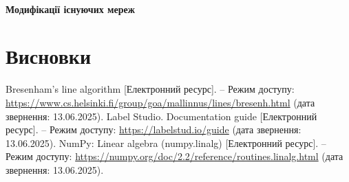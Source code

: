 \documentclass[a4paper,14pt]{report}
\begin{document}
\subsubsection{Модифікації існуючих мереж}

 



\chapter{Висновки}

\begin{thebibliography}{9}
Bresenham's line algorithm [Електронний ресурс]. – Режим доступу: \url{https://www.cs.helsinki.fi/group/goa/mallinnus/lines/bresenh.html} (дата звернення: 13.06.2025).
Label Studio. Documentation guide [Електронний ресурс]. – Режим доступу: \url{https://labelstud.io/guide} (дата звернення: 13.06.2025).
NumPy: Linear algebra (numpy.linalg) [Електронний ресурс]. – Режим доступу: \url{https://numpy.org/doc/2.2/reference/routines.linalg.html} (дата звернення: 13.06.2025).
\end{thebibliography}
\end{document}
